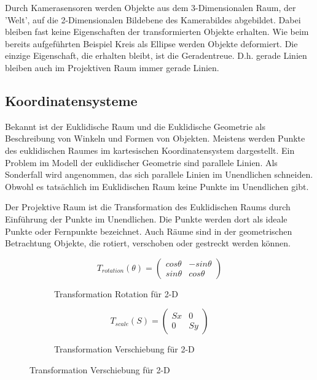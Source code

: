 Durch Kamerasensoren werden Objekte aus dem 3-Dimensionalen Raum, der 'Welt', auf die 2-Dimensionalen Bildebene des Kamerabildes abgebildet. Dabei bleiben fast keine Eigenschaften der transformierten Objekte erhalten. Wie beim bereits aufgeführten Beispiel Kreis als Ellipse werden Objekte deformiert. Die einzige Eigenschaft, die erhalten bleibt, ist die Geradentreue. D.h. gerade Linien bleiben auch im Projektiven Raum immer gerade Linien.
% 
\subsection{Koordinatensysteme}
Bekannt ist der Euklidische Raum und die Euklidische Geometrie als Beschreibung von Winkeln und Formen von Objekten. Meistens werden Punkte des euklidischen Raumes im kartesischen Koordinatensystem dargestellt. Ein Problem im Modell der euklidischer Geometrie sind parallele Linien. Als Sonderfall wird angenommen, das sich parallele Linien im Unendlichen schneiden. Obwohl es tatsächlich im Euklidischen Raum keine Punkte im Unendlichen gibt.
\newline 

Der Projektive Raum ist die Transformation des Euklidischen Raums durch Einführung der Punkte im Unendlichen. Die Punkte werden dort als ideale Punkte oder Fernpunkte bezeichnet. Auch Räume sind in der geometrischen Betrachtung Objekte, die rotiert, verschoben oder gestreckt werden können.
\newline
\begin{figure}[!ht]
  \begin{subfigure}[t]{0.45\textwidth}
    \centering
    \begin{equation}
      T_{rotation}(\theta) = 
      \begin{pmatrix}
        cos \theta & -sin \theta \\
        sin \theta & cos \theta 
      \end{pmatrix}
    \end{equation}
    \caption*{Transformation Rotation für 2-D}
    \end{subfigure}
  \hfill
  \begin{subfigure}[t]{0.45\textwidth}
    \centering
    \begin{equation}
      T_{scale}(S) = 
      \begin{pmatrix}
        Sx & 0 \\
        0 & Sy 
      \end{pmatrix}
    \end{equation}
    \caption*{Transformation Verschiebung für 2-D}
  \end{subfigure}
  \label{fig:lintrans}
\end{figure}

